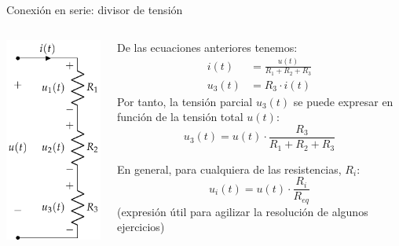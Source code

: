 \documentclass[aspectratio=169, xcolor={usenames,svgnames,dvipsnames}]{beamer}
\begin{document}

\begin{frame}{Conexión en serie: \hspace{2mm}divisor de tensión}
    \begin{columns}
    \begin{column}{0.3\columnwidth}
        \begin{center}
            \includegraphics[height=0.85\textheight]{../figs/AsociacionSerie.pdf}
        \end{center}
    \end{column}
    \begin{column}{0.7\columnwidth}
        \vspace{2mm}
    
        De las ecuaciones anteriores tenemos:
        \vspace{-2mm}
        \begin{align*}
          i(t) &= \frac{u(t)}{R_1 + R_2 + R_3}\\
          u_3(t) &= R_3 \cdot i(t)
        \end{align*}        
        Por tanto, la \alert{tensión parcial} \(u_3(t)\) se puede expresar en función de la tensión total \(u(t)\): 
        \vspace{-2mm}
        \begin{equation*}
          u_3(t) = u(t) \cdot \frac{R_3}{R_1 + R_2 + R_3}  
        \end{equation*}
        
        \alert{En general}, para cualquiera de las resistencias, $R_i$:
        \begin{equation*}
          \boxed{u_i(t) = u(t) \cdot \frac{R_i}{R_{eq}}}
        \end{equation*}
        \centering \small{(expresión útil para agilizar la resolución de algunos ejercicios)}
    \end{column}
    \end{columns}
\end{frame}
\end{document}
